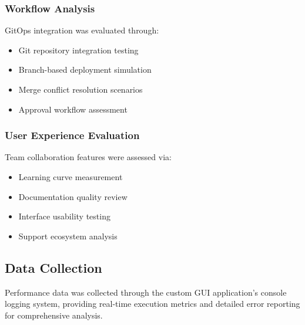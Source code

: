 \subsubsection{Workflow Analysis}
GitOps integration was evaluated through:
\begin{itemize}
    \item Git repository integration testing
    \item Branch-based deployment simulation
    \item Merge conflict resolution scenarios
    \item Approval workflow assessment
\end{itemize}

\subsubsection{User Experience Evaluation}
Team collaboration features were assessed via:
\begin{itemize}
    \item Learning curve measurement
    \item Documentation quality review
    \item Interface usability testing
    \item Support ecosystem analysis
\end{itemize}

\subsection{Data Collection}
Performance data was collected through the custom GUI application's console logging system, providing real-time execution metrics and detailed error reporting for comprehensive analysis.
